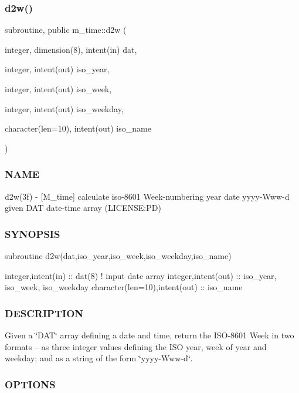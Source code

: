 \subsubsection{\texorpdfstring{d2w()}{d2w()}}
{\footnotesize\ttfamily subroutine, public m\+\_\+time\+::d2w (\begin{DoxyParamCaption}\item[{integer, dimension(8), intent(in)}]{dat,  }\item[{integer, intent(out)}]{iso\+\_\+year,  }\item[{integer, intent(out)}]{iso\+\_\+week,  }\item[{integer, intent(out)}]{iso\+\_\+weekday,  }\item[{character(len=10), intent(out)}]{iso\+\_\+name }\end{DoxyParamCaption})}



\subsubsection*{N\+A\+ME}

d2w(3f) -\/ \mbox{[}M\+\_\+time\mbox{]} calculate iso-\/8601 Week-\/numbering year date yyyy-\/\+Www-\/d given D\+AT date-\/time array (L\+I\+C\+E\+N\+SE\+:PD) 

\subsubsection*{S\+Y\+N\+O\+P\+S\+IS}

\begin{DoxyVerb}subroutine d2w(dat,iso_year,iso_week,iso_weekday,iso_name)

 integer,intent(in)              :: dat(8)     ! input date array
 integer,intent(out)             :: iso_year, iso_week, iso_weekday
 character(len=10),intent(out)   :: iso_name
\end{DoxyVerb}


\subsubsection*{D\+E\+S\+C\+R\+I\+P\+T\+I\+ON}

Given a \char`\"{}\+D\+A\+T\char`\"{} array defining a date and time, return the I\+S\+O-\/8601 Week in two formats -- as three integer values defining the I\+SO year, week of year and weekday; and as a string of the form \char`\"{}yyyy-\/\+Www-\/d\char`\"{}.

\subsubsection*{O\+P\+T\+I\+O\+NS}

